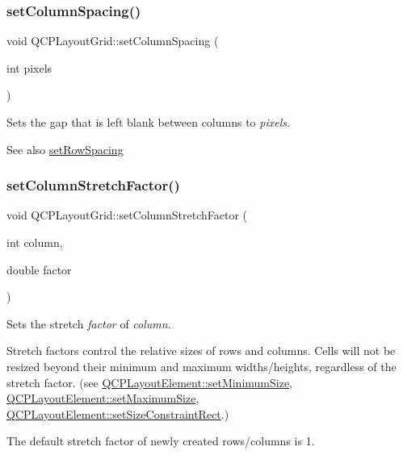 \subsubsection{\texorpdfstring{setColumnSpacing()}{setColumnSpacing()}}
{\footnotesize\ttfamily void Q\+C\+P\+Layout\+Grid\+::set\+Column\+Spacing (\begin{DoxyParamCaption}\item[{int}]{pixels }\end{DoxyParamCaption})}

Sets the gap that is left blank between columns to {\itshape pixels}.

\begin{DoxySeeAlso}{See also}
\mbox{\hyperlink{class_q_c_p_layout_grid_aaef2cd2d456197ee06a208793678e436}{set\+Row\+Spacing}} 
\end{DoxySeeAlso}
\mbox{\label{class_q_c_p_layout_grid_ae38f31a71687b9d7ee3104852528fb50}} 
\subsubsection{\texorpdfstring{setColumnStretchFactor()}{setColumnStretchFactor()}}
{\footnotesize\ttfamily void Q\+C\+P\+Layout\+Grid\+::set\+Column\+Stretch\+Factor (\begin{DoxyParamCaption}\item[{int}]{column,  }\item[{double}]{factor }\end{DoxyParamCaption})}

Sets the stretch {\itshape factor} of {\itshape column}.

Stretch factors control the relative sizes of rows and columns. Cells will not be resized beyond their minimum and maximum widths/heights, regardless of the stretch factor. (see \mbox{\hyperlink{class_q_c_p_layout_element_a5dd29a3c8bc88440c97c06b67be7886b}{Q\+C\+P\+Layout\+Element\+::set\+Minimum\+Size}}, \mbox{\hyperlink{class_q_c_p_layout_element_a74eb5280a737ab44833d506db65efd95}{Q\+C\+P\+Layout\+Element\+::set\+Maximum\+Size}}, \mbox{\hyperlink{class_q_c_p_layout_element_a361666cdcc6fbfd37344cc44be746b0f}{Q\+C\+P\+Layout\+Element\+::set\+Size\+Constraint\+Rect}}.)

The default stretch factor of newly created rows/columns is 1.

